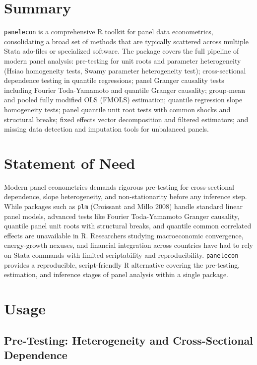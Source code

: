 \section{Summary}\label{summary}

\texttt{panelecon} is a comprehensive R toolkit for panel data
econometrics, consolidating a broad set of methods that are typically
scattered across multiple Stata ado-files or specialized software. The
package covers the full pipeline of modern panel analysis: pre-testing
for unit roots and parameter heterogeneity (Hsiao homogeneity tests,
Swamy parameter heterogeneity test); cross-sectional dependence testing
in quantile regressions; panel Granger causality tests including Fourier
Toda-Yamamoto and quantile Granger causality; group-mean and pooled
fully modified OLS (FMOLS) estimation; quantile regression slope
homogeneity tests; panel quantile unit root tests with common shocks and
structural breaks; fixed effects vector decomposition and filtered
estimators; and missing data detection and imputation tools for
unbalanced panels.

\section{Statement of Need}\label{statement-of-need}

Modern panel econometrics demands rigorous pre-testing for
cross-sectional dependence, slope heterogeneity, and non-stationarity
before any inference step. While packages such as \texttt{plm}
(Croissant and Millo 2008) handle standard linear panel models, advanced
tests like Fourier Toda-Yamamoto Granger causality, quantile panel unit
roots with structural breaks, and quantile common correlated effects are
unavailable in R. Researchers studying macroeconomic convergence,
energy-growth nexuses, and financial integration across countries have
had to rely on Stata commands with limited scriptability and
reproducibility. \texttt{panelecon} provides a reproducible,
script-friendly R alternative covering the pre-testing, estimation, and
inference stages of panel analysis within a single package.

\section{Usage}\label{usage}

\subsection{Pre-Testing: Heterogeneity and Cross-Sectional
Dependence}\label{pre-testing-heterogeneity-and-cross-sectional-dependence}


